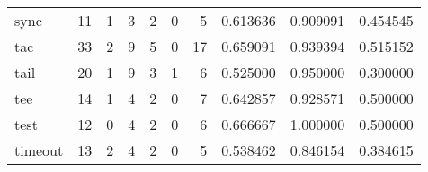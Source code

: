 \begin{tabular}{lrrrrrrrrr}
sync      &                                      11 &                                                  1 &                                                  3 &                                                  2 &                                                  0 &                                                  5 &                                           0.613636 &                               0.909091 &                             0.454545 \\
tac       &                                      33 &                                                  2 &                                                  9 &                                                  5 &                                                  0 &                                                 17 &                                           0.659091 &                               0.939394 &                             0.515152 \\
tail      &                                      20 &                                                  1 &                                                  9 &                                                  3 &                                                  1 &                                                  6 &                                           0.525000 &                               0.950000 &                             0.300000 \\
tee       &                                      14 &                                                  1 &                                                  4 &                                                  2 &                                                  0 &                                                  7 &                                           0.642857 &                               0.928571 &                             0.500000 \\
test      &                                      12 &                                                  0 &                                                  4 &                                                  2 &                                                  0 &                                                  6 &                                           0.666667 &                               1.000000 &                             0.500000 \\
timeout   &                                      13 &                                                  2 &                                                  4 &                                                  2 &                                                  0 &                                                  5 &                                           0.538462 &                               0.846154 &                             0.384615 \\

\end{tabular}
